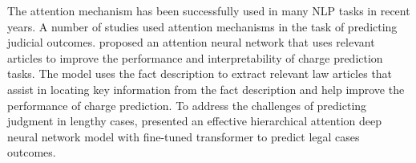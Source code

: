 \documentclass[sn-mathphys,Numbered]{sn-jnl}%
\theoremstyle{thmstyleone}%
\theoremstyle{thmstyletwo}%
\theoremstyle{thmstylethree}%
\begin{document}
The attention mechanism has been successfully used in many NLP tasks in recent years. A number of studies used attention mechanisms in the task of predicting judicial outcomes. \citet{bao2019charge} proposed an attention neural network that uses relevant articles to improve the performance and interpretability of charge prediction tasks. The model uses the fact description to extract relevant law articles that assist in locating key information from the fact description and help improve the performance of charge prediction. %
 To address the challenges of predicting judgment in lengthy cases, \citet{Sukanya2021} presented an effective hierarchical attention deep neural network model with fine-tuned transformer to predict legal cases outcomes. %
\end{document}
